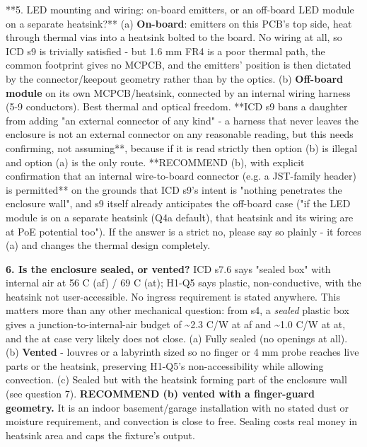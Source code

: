 \documentclass[11pt,a4paper]{article}
\begin{document}
{*}{*}5. LED mounting and wiring: on-board emitters, or an off-board LED module on a separate heatsink?{*}{*} (a) \textbf{On-board}: emitters on this PCB's top side, heat through thermal vias into a heatsink bolted to the board. No wiring at all, so ICD s9 is trivially satisfied - but 1.6 mm FR4 is a poor thermal path, the common footprint gives no MCPCB, and the emitters' position is then dictated by the connector/keepout geometry rather than by the optics. (b) \textbf{Off-board module} on its own MCPCB/heatsink, connected by an internal wiring harness (5-9 conductors). Best thermal and optical freedom. {*}{*}ICD s9 bans a daughter from adding "an external connector of any kind" - a harness that never leaves the enclosure is not an external connector on any reasonable reading, but this needs confirming, not assuming{*}{*}, because if it is read strictly then option (b) is illegal and option (a) is the only route. {*}{*}RECOMMEND (b), with explicit confirmation that an internal wire-to-board connector (e.g. a JST-family header) is permitted{*}{*} on the grounds that ICD s9's intent is "nothing penetrates the enclosure wall", and s9 itself already anticipates the off-board case ("if the LED module is on a separate heatsink (Q4a default), that heatsink and its wiring are at PoE potential too"). If the answer is a strict no, please say so plainly - it forces (a) and changes the thermal design completely.

\textbf{6. Is the enclosure sealed, or vented?} ICD s7.6 says "sealed box" with internal air at 56 C (af) / 69 C (at); H1-Q5 says plastic, non-conductive, with the heatsink not user-accessible. No ingress requirement is stated anywhere. This matters more than any other mechanical question: from s4, a \emph{sealed} plastic box gives a junction-to-internal-air budget of \textasciitilde{}2.3 C/W at af and \textasciitilde{}1.0 C/W at at, and the at case very likely does not close. (a) Fully sealed (no openings at all). (b) \textbf{Vented} - louvres or a labyrinth sized so no finger or 4 mm probe reaches live parts or the heatsink, preserving H1-Q5's non-accessibility while allowing convection. (c) Sealed but with the heatsink forming part of the enclosure wall (see question 7). \textbf{RECOMMEND (b) vented with a finger-guard geometry.} It is an indoor basement/garage installation with no stated dust or moisture requirement, and convection is close to free. Sealing costs real money in heatsink area and caps the fixture's output.
\end{document}
